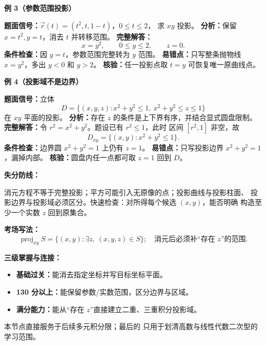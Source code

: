 \begin{knowledgeBox}
\textbf{例 3（参数范围投影）}

\textbf{题面信号：}\(\vec r(t)=(t^2,t,1-t)\)，\(0\le t\le2\)，
求 \(xy\) 投影。
\textbf{分析：}保留 \(x=t^2,y=t\)，消去 \(t\) 并转移范围。
\textbf{完整解答：}
\[
x=y^2,\qquad 0\le y\le2,\qquad z=0.
\]
\textbf{条件检查：}因 \(y=t\)，参数范围完整转为 \(y\) 范围。
\textbf{易错点：}只写整条抛物线 \(x=y^2\)，多出 \(y<0\) 和 \(y>2\)。
\textbf{核验：}任一投影点取 \(t=y\) 可恢复唯一原曲线点。

\textbf{例 4（投影域不是边界）}

\textbf{题面信号：}立体
\[
D=\{(x,y,z):x^2+y^2\le1,\ x^2+y^2\le z\le1\}
\]
在 \(xy\) 平面的投影。
\textbf{分析：}存在 \(z\) 的条件是上下界有序，并结合显式圆盘限制。
\textbf{完整解答：}令 \(r^2=x^2+y^2\)。题设已有 \(r^2\le1\)，此时
区间 \([r^2,1]\) 非空，故
\[
D_{xy}=\{(x,y):x^2+y^2\le1\}.
\]
\textbf{条件检查：}边界圆 \(x^2+y^2=1\) 上仍有 \(z=1\)。
\textbf{易错点：}只写投影边界 \(x^2+y^2=1\)，漏掉内部。
\textbf{核验：}圆盘内任一点都可取 \(z=1\) 回到 \(D\)。

\textbf{失分防线：}

消元方程不等于完整投影；平方可能引入无原像的点；投影曲线与投影柱面、
投影边界与投影域必须区分。快速检查：对所得每个候选 \((x,y)\)，能否明确
构造至少一个实数 \(z\) 回到原集合。

\textbf{考场写法：}
\[
\boxed{\operatorname{proj}_{xy}S
=\{(x,y):\exists z,\ (x,y,z)\in S\};\quad
\text{消元后必须补“存在 }z\text{”的范围}.}
\]

\textbf{三级掌握与连接：}
\begin{itemize}
  \item \textbf{基础过关：}能消去指定坐标并写目标坐标平面。
  \item \textbf{130 分以上：}能保留参数/实数范围，区分边界与区域。
  \item \textbf{满分能力：}能从“存在 \(z\)”直接建立二重、三重积分投影域。
\end{itemize}
本节点直接服务于后续多元积分限；最后的
只用于划清高数与线性代数二次型的学习范围。
\end{knowledgeBox}


\par

